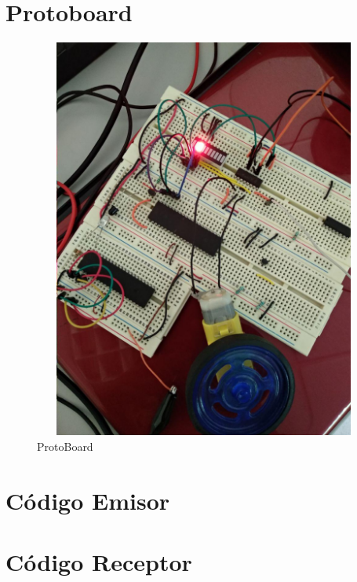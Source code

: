 \documentclass{article}
\begin{document}
\maketitle
\tableofcontents
\newpage
\section{Protoboard}
\begin{figure}[htpb!]
	\centering
	\caption{ProtoBoard}
	\includegraphics[height=500px, width=500px]{img/proto}
\end{figure}
\newpage
\section{Código Emisor}

\section{Código Receptor}

\newpage
\end{document}
